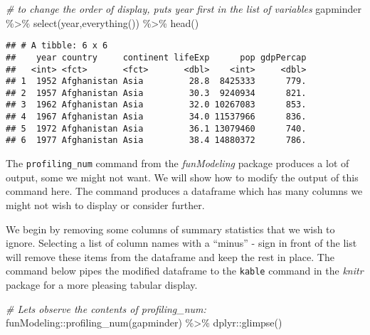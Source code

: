 \documentclass[
]{book}
\newenvironment{Shaded}{\begin{snugshade}}{\end{snugshade}}
\newcommand{\CommentTok}[1]{\textcolor[rgb]{0.56,0.35,0.01}{\textit{#1}}}
\newcommand{\FunctionTok}[1]{\textcolor[rgb]{0.00,0.00,0.00}{#1}}
\newcommand{\NormalTok}[1]{#1}
\newcommand{\SpecialCharTok}[1]{\textcolor[rgb]{0.00,0.00,0.00}{#1}}
\begin{document}
\begin{Shaded}
\begin{Highlighting}[]
\CommentTok{\# to change the order of display, puts year first in the list of variables}
\NormalTok{gapminder }\SpecialCharTok{\%\textgreater{}\%} 
  \FunctionTok{select}\NormalTok{(year,}\FunctionTok{everything}\NormalTok{()) }\SpecialCharTok{\%\textgreater{}\%} 
  \FunctionTok{head}\NormalTok{()}
\end{Highlighting}
\end{Shaded}

\begin{verbatim}
## # A tibble: 6 x 6
##    year country     continent lifeExp      pop gdpPercap
##   <int> <fct>       <fct>       <dbl>    <int>     <dbl>
## 1  1952 Afghanistan Asia         28.8  8425333      779.
## 2  1957 Afghanistan Asia         30.3  9240934      821.
## 3  1962 Afghanistan Asia         32.0 10267083      853.
## 4  1967 Afghanistan Asia         34.0 11537966      836.
## 5  1972 Afghanistan Asia         36.1 13079460      740.
## 6  1977 Afghanistan Asia         38.4 14880372      786.
\end{verbatim}

The \texttt{profiling\_num} command from the \emph{funModeling} package produces a lot of output, some we might not want. We will
show how to modify the output of this command here. The command produces a dataframe which has many columns we might not wish to display or consider further.

We begin by removing some columns of summary statistics that we wish to ignore. Selecting a list of column names with a ``minus'' - sign in front of the list will remove these items from the dataframe and keep the rest in place. The command below pipes the modified dataframe to the \texttt{kable} command in the \emph{knitr} package for a more pleasing tabular display.

\begin{Shaded}
\begin{Highlighting}[]
\CommentTok{\# Let\textquotesingle{}s observe the contents of profiling\_num:}
\NormalTok{funModeling}\SpecialCharTok{::}\FunctionTok{profiling\_num}\NormalTok{(gapminder) }\SpecialCharTok{\%\textgreater{}\%} 
\NormalTok{  dplyr}\SpecialCharTok{::}\FunctionTok{glimpse}\NormalTok{()}
\end{Highlighting}
\end{Shaded}
\end{document}
